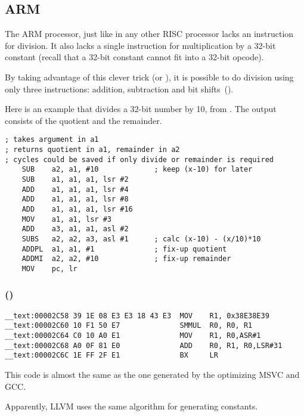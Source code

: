 ﻿\subsection{ARM}

The ARM processor, just like in any other  RISC processor lacks an instruction for division.
It also lacks a single instruction for multiplication by a 32-bit constant (recall that a 32-bit
constant cannot fit into a 32-bit opcode).

By taking advantage of this clever trick (or ), it is possible to do division using only three instructions: addition,
subtraction and bit shifts~().

Here is an example that divides a 32-bit number by 10, from
.
The output consists of the quotient and the remainder.

\begin{lstlisting}[style=customasmARM]
; takes argument in a1
; returns quotient in a1, remainder in a2
; cycles could be saved if only divide or remainder is required
    SUB    a2, a1, #10             ; keep (x-10) for later
    SUB    a1, a1, a1, lsr #2
    ADD    a1, a1, a1, lsr #4
    ADD    a1, a1, a1, lsr #8
    ADD    a1, a1, a1, lsr #16
    MOV    a1, a1, lsr #3
    ADD    a3, a1, a1, asl #2
    SUBS   a2, a2, a3, asl #1      ; calc (x-10) - (x/10)*10
    ADDPL  a1, a1, #1              ; fix-up quotient
    ADDMI  a2, a2, #10             ; fix-up remainder
    MOV    pc, lr
\end{lstlisting}

\subsubsection{\OptimizingXcodeIV (\ARMMode)}

\begin{lstlisting}[style=customasmARM]
__text:00002C58 39 1E 08 E3 E3 18 43 E3  MOV    R1, 0x38E38E39
__text:00002C60 10 F1 50 E7              SMMUL  R0, R0, R1
__text:00002C64 C0 10 A0 E1              MOV    R1, R0,ASR#1
__text:00002C68 A0 0F 81 E0              ADD    R0, R1, R0,LSR#31
__text:00002C6C 1E FF 2F E1              BX     LR
\end{lstlisting}

This code is almost the same as the one generated by the optimizing MSVC and GCC.

Apparently, LLVM uses the same algorithm for generating constants.

